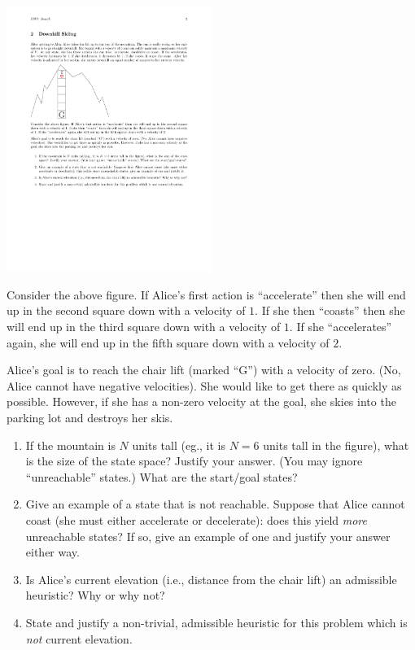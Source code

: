 \documentclass[fleqn]{hermans-hw}
\begin{document}
\includegraphics[width=0.5\textwidth]{hw1-skiing.pdf}

Consider the above figure.  If Alice's first action is ``accelerate''
then she will end up in the second square down with a velocity of
$1$.  If she then ``coasts'' then she will end up in the third square
down with a velocity of $1$.  If she ``accelerates'' again, she will
end up in the fifth square down with a velocity of $2$.

Alice's goal is to reach the chair lift (marked ``G'') with a velocity
of zero.  (No, Alice cannot have negative velocities).  She would like
to get there as quickly as possible.  However, if she has a non-zero
velocity at the goal, she skies into the parking lot and destroys her
skis.


\begin{enumerate}
\item If the mountain is $N$ units tall (eg., it is $N=6$ units tall in
the figure), what is the size of the state space?  Justify your
answer.  (You may ignore ``unreachable'' states.)  What are the
start/goal states?

\item Give an example of a state that is not reachable.  Suppose that
Alice cannot coast (she must either accelerate or decelerate): does this
yield \emph{more} unreachable states? If so, give an example of one and
justify your answer either way.

\item Is Alice's current elevation (i.e., distance from the chair lift)
an admissible heuristic?  Why or why not?

\item State and justify a non-trivial, admissible heuristic for this
problem which is \emph{not} current elevation.
\end{enumerate}
\end{document}
